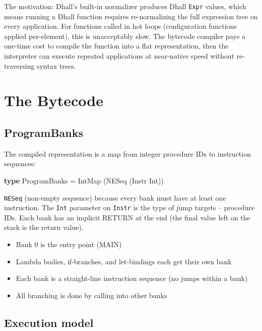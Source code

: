 \documentclass[]{article}
\newenvironment{Shaded}{}{}
\newcommand{\DataTypeTok}[1]{\textcolor[rgb]{0.56,0.13,0.00}{#1}}
\newcommand{\KeywordTok}[1]{\textcolor[rgb]{0.00,0.44,0.13}{\textbf{#1}}}
\newcommand{\NormalTok}[1]{#1}
\newcommand{\OtherTok}[1]{\textcolor[rgb]{0.00,0.44,0.13}{#1}}
\begin{document}
The motivation: Dhall's built-in normalizer produces Dhall \texttt{Expr} values,
which means running a Dhall function requires re-normalizing the full expression
tree on every application. For functions called in hot loops (configuration
functions applied per-element), this is unacceptably slow. The bytecode compiler
pays a one-time cost to compile the function into a flat representation, then
the interpreter can execute repeated applications at near-native speed without
re-traversing syntax trees.

\section{The Bytecode}\label{the-bytecode}

\subsection{ProgramBanks}\label{programbanks}

The compiled representation is a map from integer procedure IDs to instruction
sequences:

\begin{Shaded}
\begin{Highlighting}[]
\KeywordTok{type} \DataTypeTok{ProgramBanks} \OtherTok{=} \DataTypeTok{IntMap}\NormalTok{ (}\DataTypeTok{NESeq}\NormalTok{ (}\DataTypeTok{Instr} \DataTypeTok{Int}\NormalTok{))}
\end{Highlighting}
\end{Shaded}

\texttt{NESeq} (non-empty sequence) because every bank must have at least one
instruction. The \texttt{Int} parameter on \texttt{Instr} is the type of jump
targets -- procedure IDs. Each bank has an implicit RETURN at the end (the final
value left on the stack is the return value).

\begin{itemize}
\tightlist
\item
  Bank 0 is the entry point (MAIN)
\item
  Lambda bodies, if-branches, and let-bindings each get their own bank
\item
  Each bank is a straight-line instruction sequence (no jumps within a bank)
\item
  All branching is done by calling into other banks
\end{itemize}

\subsection{Execution model}\label{execution-model}
\end{document}
